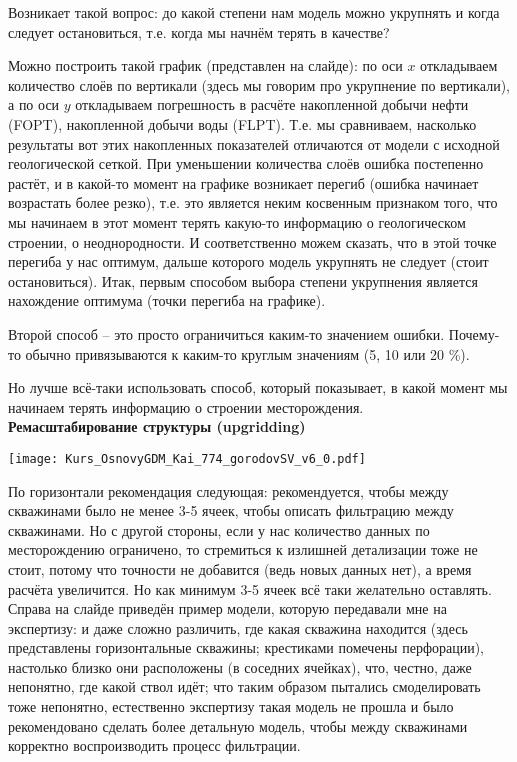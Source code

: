\documentclass[main.tex]{subfiles}
\begin{document}
Возникает такой вопрос: до какой степени нам модель можно укрупнять и когда следует остановиться, т.е. когда мы начнём терять в качестве?

Можно построить такой график (представлен на слайде): по оси $x$ откладываем количество слоёв по вертикали (здесь мы говорим про укрупнение по вертикали), а по оси $y$ откладываем погрешность в расчёте накопленной добычи нефти (FOPT), накопленной добычи воды (FLPT).
Т.е. мы сравниваем, насколько результаты вот этих накопленных показателей отличаются от модели с исходной геологической сеткой.
При уменьшении количества слоёв ошибка постепенно растёт, и в какой-то момент на графике возникает перегиб (ошибка начинает возрастать более резко), т.е. это является неким косвенным признаком того, что мы начинаем в этот момент терять какую-то информацию о геологическом строении, о неоднородности.
И соответственно можем сказать, что в этой точке перегиба у нас оптимум, дальше которого модель укрупнять не следует (стоит остановиться).
Итак, первым способом выбора степени укрупнения является нахождение оптимума (точки перегиба на графике).

Второй способ -- это просто ограничиться каким-то значением ошибки. Почему-то обычно привязываются к каким-то круглым значениям (5, 10 или 20 \%).

Но лучше всё-таки использовать способ, который показывает, в какой момент мы начинаем терять информацию о строении месторождения.
\\

\textbf{Ремасштабирование структуры (upgridding)}

\texttt{[image: Kurs\_OsnovyGDM\_Kai\_774\_gorodovSV\_v6\_0.pdf]}

По горизонтали рекомендация следующая: рекомендуется, чтобы между скважинами было не менее 3-5 ячеек, чтобы описать фильтрацию между скважинами.
Но с другой стороны, если у нас количество данных по месторождению ограничено, то стремиться к излишней детализации тоже не стоит, потому что точности не добавится (ведь новых данных нет), а время расчёта увеличится.
Но как минимум 3-5 ячеек всё таки желательно оставлять.
Справа на слайде приведён пример модели, которую передавали мне на экспертизу: и даже сложно различить, где какая скважина находится (здесь представлены горизонтальные скважины; крестиками помечены перфорации), настолько близко они расположены (в соседних ячейках), что, честно, даже непонятно, где какой ствол идёт; что таким образом пытались смоделировать тоже непонятно, естественно экспертизу такая модель не прошла и было рекомендовано сделать более детальную модель, чтобы между скважинами корректно воспроизводить процесс фильтрации.
\end{document}
